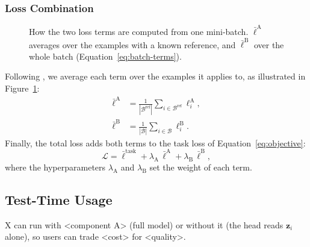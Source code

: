 \subsubsection{Loss Combination} \label{sec:loss-combination}
\begin{figure}[t]
    \centering
    \caption{How the two loss terms are computed from one mini-batch. $\bar{\ell}^{\text{A}}$ averages over the examples with a known reference, and $\bar{\ell}^{\text{B}}$ over the whole batch (\ie Equation~\ref{eq:batch-terms}).}
    \label{fig:loss-terms}
    \vspace{-6pt}
\end{figure}
Following \cite{Placeholder-B}, we average each term over the examples it applies to, as illustrated in Figure~\ref{fig:loss-terms}:
\begin{equation}
\label{eq:batch-terms}
\begin{aligned}
\bar{\ell}^{\text{A}} &= \frac{1}{|\mathcal{B}^{\text{ref}}|}\sum_{i \in \mathcal{B}^{\text{ref}}}{\ell_{i}^{\text{A}}},\\
\bar{\ell}^{\text{B}} &= \frac{1}{|\mathcal{B}|}\sum_{i \in \mathcal{B}}{\ell_{i}^{\text{B}}}.
\end{aligned}
\end{equation}
Finally, the total loss adds both terms to the task loss of Equation~\ref{eq:objective}:
\begin{equation}
\label{eq:total-loss}
\mathcal{L} = \bar{\ell}^{\text{task}} + \lambda_{\text{A}}\, \bar{\ell}^{\text{A}} + \lambda_{\text{B}}\, \bar{\ell}^{\text{B}},
\end{equation}
where the hyperparameters $\lambda_{\text{A}}$ and $\lambda_{\text{B}}$ set the weight of each term.

\subsection{Test-Time Usage} \label{sec:inference}
X can run with <component A> (full model) or without it (the head reads $\mathbf{z}_{i}$ alone), so users can trade <cost> for <quality>.
